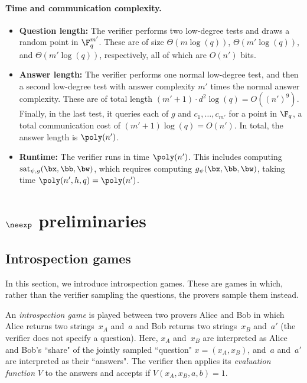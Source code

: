 \documentclass[11pt]{article}
\begin{document}
\paragraph{Time and communication complexity.}
\begin{itemize}
\itemsep -.5pt
\item[$\circ$] \textbf{Question length:} The verifier performs two low-degree tests and draws a random point in $\F_q^{m'}$.
			These are of size $\Theta(m \log(q))$, $\Theta(m'\log(q))$, and $\Theta(m'\log(q))$, respectively,
			all of which are $O(n')$ bits.
\item[$\circ$] \textbf{Answer length:} The verifier performs one normal low-degree test, and then a second low-degree test with answer complexity $m'$ times the normal answer complexity. These are of total length $(m' + 1) \cdot d^2 \log(q) = O((n')^9)$. Finally, in the last test, it queries each of $g$ and $c_1, \ldots, c_{m'}$ for a point in $\F_q$, a total communication cost of $(m'+1) \log(q) = O(n')$. In total, the answer length is $\poly(n')$.
\item[$\circ$] \textbf{Runtime:} The verifier runs in time $\poly(n')$. This includes computing $\mathrm{sat}_{\psi,g}(\bx, \bb, \bw)$,
						which requires computing $g_{\psi}(\bx, \bb, \bw)$, taking time $\poly(n', h, q) = \poly(n')$.
\end{itemize}



\section{$\neexp$ preliminaries}

\subsection{Introspection games}

In this section, we introduce introspection games.
These are games in which, rather than the verifier sampling the questions,
the provers sample them instead.

\begin{definition}
An \emph{introspection game} is played between two provers Alice and Bob
in which Alice returns two strings~$x_A$ and~$a$
and Bob returns two strings~$x_B$ and~$a'$ (the verifier does not specify a question).
Here, $x_A$ and~$x_B$ are interpreted as Alice and Bob's ``share" of the jointly sampled ``question" $x = (x_A, x_B)$,
and~$a$ and~$a'$ are interpreted as their ``answers".
The verifier then applies its \emph{evaluation function} $V$ to the answers
and accepts if $V(x_A, x_B, a, b)=1$.
\end{definition}
\end{document}
